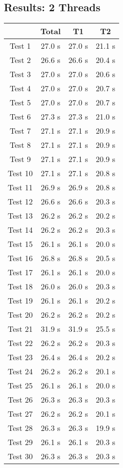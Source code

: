 \documentclass[12pt]{article}
\begin{document}
\subsection{Results: 2 Threads}
\begin{tabular}{ | c | c | c | c | }
  \hline	 & Total & T1 & T2 \\ \hline 
  Test 1& 27.0 s& 27.0 s& 21.1 s\\ \hline 
  Test 2& 26.6 s& 26.6 s& 20.4 s\\ \hline 
  Test 3& 27.0 s& 27.0 s& 20.6 s\\ \hline 
  Test 4& 27.0 s& 27.0 s& 20.7 s\\ \hline 
  Test 5& 27.0 s& 27.0 s& 20.7 s\\ \hline 
  Test 6& 27.3 s& 27.3 s& 21.0 s\\ \hline 
  Test 7& 27.1 s& 27.1 s& 20.9 s\\ \hline 
  Test 8& 27.1 s& 27.1 s& 20.9 s\\ \hline 
  Test 9& 27.1 s& 27.1 s& 20.9 s\\ \hline 
  Test 10& 27.1 s& 27.1 s& 20.8 s\\ \hline 
  Test 11& 26.9 s& 26.9 s& 20.8 s\\ \hline 
  Test 12& 26.6 s& 26.6 s& 20.3 s\\ \hline 
  Test 13& 26.2 s& 26.2 s& 20.2 s\\ \hline 
  Test 14& 26.2 s& 26.2 s& 20.3 s\\ \hline 
  Test 15& 26.1 s& 26.1 s& 20.0 s\\ \hline 
  Test 16& 26.8 s& 26.8 s& 20.5 s\\ \hline 
  Test 17& 26.1 s& 26.1 s& 20.0 s\\ \hline 
  Test 18& 26.0 s& 26.0 s& 20.3 s\\ \hline 
  Test 19& 26.1 s& 26.1 s& 20.2 s\\ \hline 
  Test 20& 26.2 s& 26.2 s& 20.2 s\\ \hline 
  Test 21& 31.9 s& 31.9 s& 25.5 s\\ \hline 
  Test 22& 26.2 s& 26.2 s& 20.3 s\\ \hline 
  Test 23& 26.4 s& 26.4 s& 20.2 s\\ \hline 
  Test 24& 26.2 s& 26.2 s& 20.1 s\\ \hline 
  Test 25& 26.1 s& 26.1 s& 20.0 s\\ \hline 
  Test 26& 26.3 s& 26.3 s& 20.3 s\\ \hline 
  Test 27& 26.2 s& 26.2 s& 20.1 s\\ \hline 
  Test 28& 26.3 s& 26.3 s& 19.9 s\\ \hline 
  Test 29& 26.1 s& 26.1 s& 20.3 s\\ \hline 
  Test 30& 26.3 s& 26.3 s& 20.3 s\\ \hline 
  \end{tabular}
  
\end{document}
